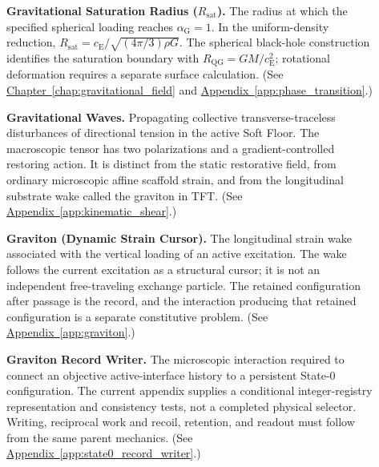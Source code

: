 \begin{description}
\item[] \begin{minipage}[t]{\linewidth}
\textbf{Gravitational Saturation Radius ($R_{\mathrm{sat}}$).} The radius at which the specified spherical loading reaches $\alpha_{\mathrm G}=1$. In the uniform-density reduction, $R_{\mathrm{sat}}=c_{\mathrm E}/\sqrt{(4\pi/3)\rho G}$. The spherical black-hole construction identifies the saturation boundary with $R_{\mathrm{QG}}=GM/c_{\mathrm E}^2$; rotational deformation requires a separate surface calculation.
(See \hyperref[chap:gravitational_field]{Chapter~\ref*{chap:gravitational_field}} and \hyperref[app:phase_transition]{Appendix~\ref*{app:phase_transition}}.)
\end{minipage}

\item[] \begin{minipage}[t]{\linewidth}
\textbf{Gravitational Waves.} Propagating collective transverse-traceless disturbances of directional tension in the active Soft Floor. The macroscopic tensor has two polarizations and a gradient-controlled restoring action. It is distinct from the static restorative field, from ordinary microscopic affine scaffold strain, and from the longitudinal substrate wake called the graviton in TFT.
(See \hyperref[app:kinematic_shear]{Appendix~\ref*{app:kinematic_shear}}.)
\end{minipage}

\item[] \begin{minipage}[t]{\linewidth}
\textbf{Graviton (Dynamic Strain Cursor).} The longitudinal strain wake associated with the vertical loading of an active excitation. The wake follows the current excitation as a structural cursor; it is not an independent free-traveling exchange particle. The retained configuration after passage is the record, and the interaction producing that retained configuration is a separate constitutive problem.
(See \hyperref[app:graviton]{Appendix~\ref*{app:graviton}}.)
\end{minipage}

\item[] \begin{minipage}[t]{\linewidth}
\textbf{Graviton Record Writer.} The microscopic interaction required to connect an objective active-interface history to a persistent State-0 configuration. The current appendix supplies a conditional integer-registry representation and consistency tests, not a completed physical selector. Writing, reciprocal work and recoil, retention, and readout must follow from the same parent mechanics.
(See \hyperref[app:state0_record_writer]{Appendix~\ref*{app:state0_record_writer}}.)
\end{minipage}


\end{description}
